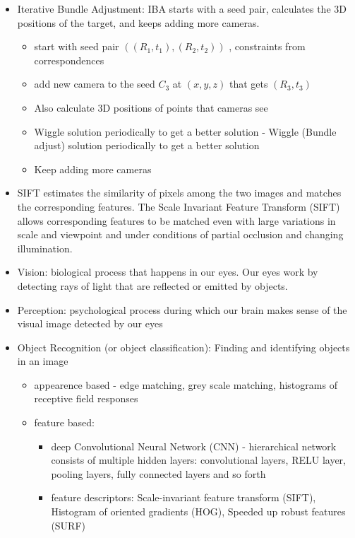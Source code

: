 \documentclass[10pt]{article}
\begin{document}
\begin{itemize}[label=\(\star\), leftmargin=1em, itemsep=-0.3em]
    \item Iterative Bundle Adjustment: IBA starts with a seed pair, calculates the 3D positions of the target, and keeps adding more cameras.
          \begin{itemize}[label=\(\star\), leftmargin=1em, itemsep=-0.3em]
              \item start with seed pair $((R_1, t_1), (R_2, t_2))$ , constraints from correspondences
              \item add new camera to the seed $C_3$ at $(x,y,z)$ that gets $(R_3, t_3)$
              \item Also calculate 3D positions of points that cameras see
              \item Wiggle solution periodically to get a better solution - Wiggle (Bundle adjust) solution periodically to get a better solution
              \item Keep adding more cameras
          \end{itemize}
    \item SIFT estimates the similarity of pixels among the two images and matches the corresponding features.  The Scale Invariant Feature Transform (SIFT) allows corresponding features to be matched even with large variations in scale and viewpoint and under conditions of partial occlusion and changing illumination.
    \item Vision: biological process that happens in our eyes. Our eyes work by detecting rays of light that are reflected or emitted by objects.
    \item Perception: psychological process during which our brain makes sense of the visual image detected by our eyes
    \item Object Recognition (or object classification): Finding and identifying objects in an image
          \begin{itemize}[label=\(\star\), leftmargin=1em, itemsep=-0.3em]
              \item appearence based - edge matching, grey scale matching, histograms of receptive field responses
              \item feature based:
                    \begin{itemize}[label=\(\star\), leftmargin=1em, itemsep=-0.3em]
                        \item deep Convolutional Neural Network (CNN) - hierarchical network consists of multiple hidden layers: convolutional layers, RELU layer, pooling layers, fully connected layers and so forth
                        \item feature descriptors: Scale-invariant feature transform (SIFT),  Histogram of oriented gradients (HOG),  Speeded up robust features (SURF)
                    \end{itemize}
          \end{itemize}



\end{itemize}
\end{document}
